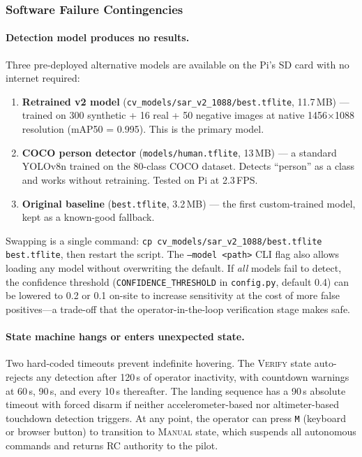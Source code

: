 \subsubsection{Software Failure Contingencies}\label{sec:sw-contingencies}

\paragraph{Detection model produces no results.}
Three pre-deployed alternative models are available on the Pi's SD card with no internet required:

\begin{enumerate}
  \item \textbf{Retrained v2 model} (\texttt{cv\_models/sar\_v2\_1088/best.tflite}, 11.7\,MB) --- trained on 300 synthetic + 16 real + 50 negative images at native 1456$\times$1088 resolution (mAP50 = 0.995).  This is the primary model.
  \item \textbf{COCO person detector} (\texttt{models/human.tflite}, 13\,MB) --- a standard YOLOv8n trained on the 80-class COCO dataset.  Detects ``person'' as a class and works without retraining.  Tested on Pi at 2.3\,FPS.
  \item \textbf{Original baseline} (\texttt{best.tflite}, 3.2\,MB) --- the first custom-trained model, kept as a known-good fallback.
\end{enumerate}

Swapping is a single command: \texttt{cp cv\_models/sar\_v2\_1088/best.tflite best.tflite}, then restart the script.  The \texttt{--model <path>} CLI flag also allows loading any model without overwriting the default.  If \emph{all} models fail to detect, the confidence threshold (\texttt{CONFIDENCE\_THRESHOLD} in \texttt{config.py}, default 0.4) can be lowered to 0.2 or 0.1 on-site to increase sensitivity at the cost of more false positives---a trade-off that the operator-in-the-loop verification stage makes safe.

\paragraph{State machine hangs or enters unexpected state.}
Two hard-coded timeouts prevent indefinite hovering.  The \textsc{Verify} state auto-rejects any detection after 120\,s of operator inactivity, with countdown warnings at 60\,s, 90\,s, and every 10\,s thereafter.  The landing sequence has a 90\,s absolute timeout with forced disarm if neither accelerometer-based nor altimeter-based touchdown detection triggers.  At any point, the operator can press \texttt{M} (keyboard or browser button) to transition to \textsc{Manual} state, which suspends all autonomous commands and returns RC authority to the pilot.

